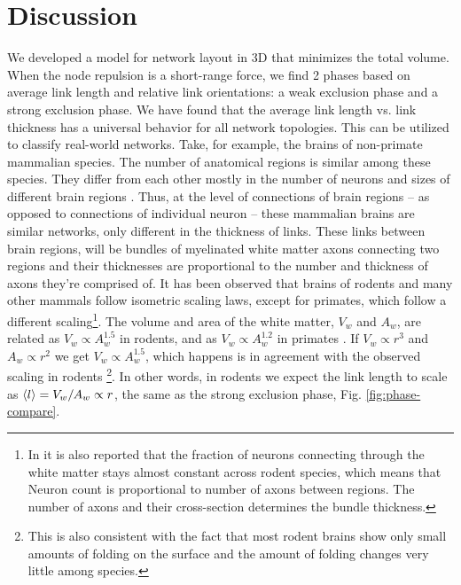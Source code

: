 \documentclass[nofootinbib,preprint,floatfix]{revtex4} %
\begin{document}
\section{Discussion}
We developed a model for network layout in 3D that minimizes the total volume. 
When the node repulsion is a short-range force, we find 2 phases based on average link length and relative link orientations: a weak exclusion phase and a strong exclusion phase. We have found that the average link length vs. link thickness has a universal behavior for all network topologies. This can be utilized to classify real-world networks. Take, for example, the brains of non-primate mammalian species. The number of anatomical regions is similar among these species. They differ from each other mostly in the number of neurons and sizes of different brain regions \cite{azevedo2009equal, herculano2012remarkable, herculano2014brain}. 
Thus, at the level of connections of brain regions -- as opposed to connections of individual neuron -- these mammalian brains are similar networks, only different in the thickness of links. These links 
between brain regions, will be bundles of myelinated white matter axons connecting two regions and their thicknesses are proportional to the number and thickness of axons they're comprised of. 
It has been observed that brains of rodents \cite{herculano2012remarkable} and many other mammals \cite{herculano2014brain} follow isometric scaling laws, except for primates, which follow a different scaling\footnote{In \cite{herculano2012remarkable} it is also reported that the fraction of neurons connecting through the white matter stays almost constant across rodent species, which means that Neuron count is proportional to number of axons between regions. The number of axons and their cross-section determines the bundle thickness.}. 
The volume and area of the white matter, $V_w$ and $A_w$, are related as $V_w\propto A_w^{1.5}$ in rodents, and as $V_w \propto A_w^{1.2}$ in primates  \cite{herculano2012remarkable}. 
If $V_w \propto r^3$ and $A_w \propto r^2$ we get $V_w \propto A_w^{1.5}$, which happens is in agreement with the observed scaling in rodents
\footnote{This is also consistent with the fact that most rodent brains show only small amounts of folding on the surface and the amount of folding changes very little among species.}. In other words, in rodents we expect the link length to scale as $ \left<l\right> = V_w/A_w \propto r $, the same as the strong exclusion phase, Fig. \ref{fig:phase-compare}. 
\end{document}
